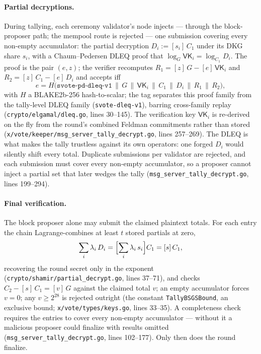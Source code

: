 \documentclass[11pt,a4paper]{article}
\theoremstyle{definition}
\begin{document}
\paragraph{Partial decryptions.} During tallying, each ceremony validator's
node injects --- through the block-proposer path; the mempool route is
rejected --- one submission covering every non-empty accumulator: the
partial decryption $D_i := [s_i]\,C_1$ under its DKG share $s_i$, with a
Chaum--Pedersen DLEQ proof that
$\log_G \mathsf{VK}_i = \log_{C_1} D_i$. The proof is the pair $(e, z)$; the
verifier recomputes $R_1 = [z]\,G - [e]\,\mathsf{VK}_i$ and
$R_2 = [z]\,C_1 - [e]\,D_i$ and accepts iff
\[
e = H\bigl(\mathtt{svote\text{-}pd\text{-}dleq\text{-}v1} \,\|\, G \,\|\,
\mathsf{VK}_i \,\|\, C_1 \,\|\, D_i \,\|\, R_1 \,\|\, R_2\bigr),
\]
with $H$ a BLAKE2b-256 hash-to-scalar; the tag separates this proof family
from the tally-level DLEQ family (\texttt{svote-dleq-v1}), barring
cross-family replay (\texttt{crypto/elgamal/dleq.go}, lines 30--145). The
verification key $\mathsf{VK}_i$ is re-derived on the fly from the round's
combined Feldman commitments rather than stored
(\texttt{x/vote/keeper/msg\_server\_tally\_decrypt.go}, lines 257--269).
The DLEQ is what makes the tally trustless against its own operators: one
forged $D_i$ would silently shift every total. Duplicate submissions per
validator are rejected, and each submission must cover every non-empty
accumulator, so a proposer cannot inject a partial set that later wedges the
tally (\texttt{msg\_server\_tally\_decrypt.go}, lines 199--294).

\paragraph{Final verification.} The block proposer alone may submit the
claimed plaintext totals. For each entry the chain Lagrange-combines at
least $t$ stored partials at zero,
\[
\sum_i \lambda_i\, D_i = \Bigl[\sum_i \lambda_i\, s_i\Bigr] C_1 =
[s]\,C_1,
\]
recovering the round secret only in the exponent
(\texttt{crypto/shamir/partial\_decrypt.go}, lines 37--71), and checks
$C_2 - [s]\,C_1 = [v]\,G$ against the claimed total $v$; an empty
accumulator forces $v = 0$; any $v \geq 2^{28}$ is rejected outright (the
constant \texttt{TallyBSGSBound}, an exclusive bound;
\texttt{x/vote/types/keys.go}, lines 33--35). A completeness check requires
the entries to cover every non-empty accumulator --- without it a malicious
proposer could finalize with results omitted
(\texttt{msg\_server\_tally\_decrypt.go}, lines 102--177). Only then does
the round finalize.
\end{document}

